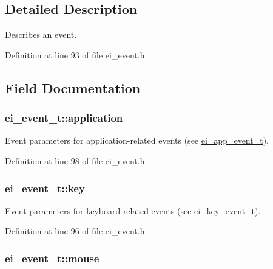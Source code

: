 \subsection{Detailed Description}
Describes an event. 

Definition at line 93 of file ei\-\_\-event.\-h.



\subsection{Field Documentation}
\hypertarget{structei__event__t_ab93b7dc04597613a3bd0195e74a9f7bb}{
\subsubsection[{application}]{ ei\-\_\-event\-\_\-t\-::application}}\label{structei__event__t_ab93b7dc04597613a3bd0195e74a9f7bb}


Event parameters for application-\/related events (see \hyperlink{structei__app__event__t}{ei\-\_\-app\-\_\-event\-\_\-t}). 



Definition at line 98 of file ei\-\_\-event.\-h.

\hypertarget{structei__event__t_a0f146bb41b78f27e18ecccc71f50026d}{
\subsubsection[{key}]{ ei\-\_\-event\-\_\-t\-::key}}\label{structei__event__t_a0f146bb41b78f27e18ecccc71f50026d}


Event parameters for keyboard-\/related events (see \hyperlink{structei__key__event__t}{ei\-\_\-key\-\_\-event\-\_\-t}). 



Definition at line 96 of file ei\-\_\-event.\-h.

\hypertarget{structei__event__t_a7f0b0d0cf765a822aca7a435510d9d85}{
\subsubsection[{mouse}]{ ei\-\_\-event\-\_\-t\-::mouse}}\label{structei__event__t_a7f0b0d0cf765a822aca7a435510d9d85}


